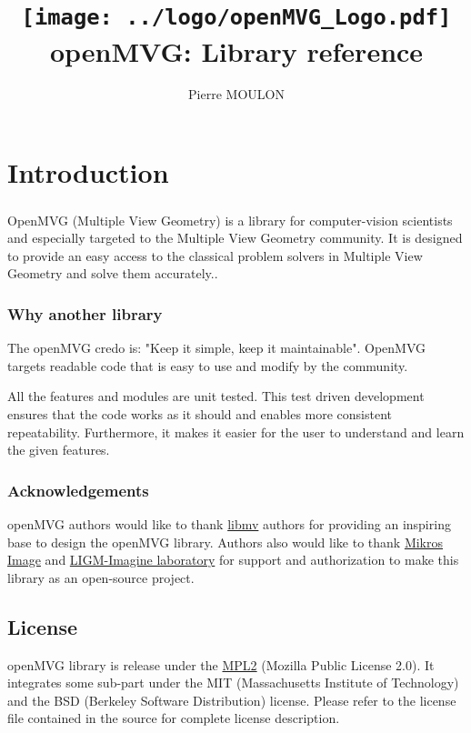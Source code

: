 \documentclass[11pt, letterpaper]{report}
\title{\texttt{[image: ../logo/openMVG\_Logo.pdf]}\newline
openMVG: Library reference
}
\author{Pierre MOULON}
\begin{document}
\maketitle
\newpage
\tableofcontents
\newpage

\chapter{Introduction}

\paragraph{}
OpenMVG (Multiple View Geometry) is a library for computer-vision scientists and especially targeted to the Multiple View Geometry community. It is designed to provide an easy access to the classical problem solvers in Multiple View Geometry and solve them accurately..

\subsection*{Why another library}
The openMVG credo is: "Keep it simple, keep it maintainable". OpenMVG targets readable code that is easy to use and modify by the community.\newline

All the features and modules are unit tested. This test driven development ensures that the code works as it should and enables more consistent repeatability. Furthermore, it makes it easier for the user to understand and learn the given features.

\subsection*{Acknowledgements}

openMVG authors would like to thank \href{http://code.google.com/p/libmv/}{libmv} authors for providing an inspiring base to design the openMVG library. Authors also would like to thank \href{http://www.mikrosimage.eu/}{Mikros Image} and \href{http://imagine.enpc.fr/}{LIGM-Imagine laboratory} for support and authorization to make this library as an open-source project.

\section*{License}

openMVG library is release under the \href{http://www.mozilla.org/MPL/2.0/}{MPL2} (Mozilla Public License 2.0). It integrates some sub-part under the MIT (Massachusetts Institute of Technology) and the BSD (Berkeley Software Distribution) license. Please refer to the license file contained in the source for complete license description.
\end{document}
